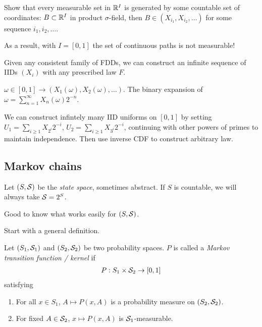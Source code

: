 \begin{exercise}
  Show that every measurable set in $\mathbb{R}^I$ is generated by some countable
  set of coordinates: $B \subset \mathbb{R}^I$ in product $\sigma$-field, then
  $B \in (X_{i_1}, X_{i_2}, \ldots)$ for some sequence $i_1, i_2, \ldots$.

  As a result, with $I = [0,1]$ the set of continuous paths is not
  measurable!
\end{exercise}

\begin{example}
  Given any consistent family of FDDs, we can construct an infinite sequence of
  IIDs $(X_i)$ with any prescribed law $F$.

  $\omega \in [0,1] \to (X_1(\omega), X_2(\omega), \ldots)$.
  The binary expansion of $\omega = \sum_{n=1}^\infty X_n(\omega) 2^{-n}$.

  We can construct infintely many IID uniforms on $[0,1]$ by setting
  $U_1 = \sum_{i \geq 1} X_{2^i} 2^{-i}$, $U_2 = \sum_{i \geq 1} X_{3^i} 2^{-i}$,
  continuing with other powers of primes to maintain independence.
  Then use inverse CDF to construct arbitrary law.
\end{example}

\subsection{Markov chains}%
\label{sub:Markov chains}

Let $(S, \mathcal{S})$ be the \emph{state space}, sometimes abstract.
If $S$ is countable, we will always take $\mathcal{S} = 2^S$.

Good to know what works easily for $(S, \mathcal{S})$.

Start with a general definition.

\begin{definition}
  Let $(S_1, \mathcal{S}_1)$ and $(S_2, \mathcal{S}_2)$
  be two probability spaces.
  $P$ is called a \emph{Markov transition function / kernel} if
  \begin{align*}
    P : S_1 \times \mathcal{S}_2 \to [0,1]
  \end{align*}
  satisfying
  \begin{enumerate}
    \item For all $x \in S_1$, $A \mapsto P(x, A)$ is a probability measure
      on $(S_2, \mathcal{S}_2)$.
    \item For fixed $A \in \mathcal{S}_2$, $x \mapsto P(x, A)$ is $\mathcal{S}_1$-measurable.
  \end{enumerate}
\end{definition}

